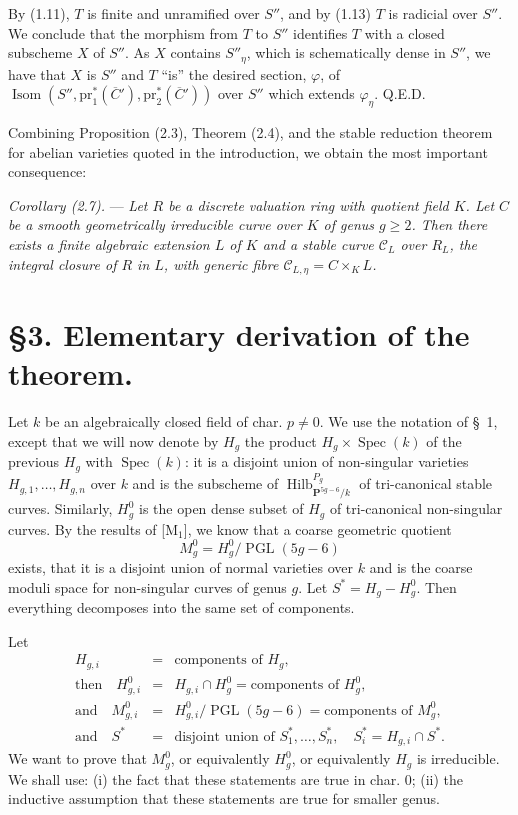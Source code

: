 \documentclass[10pt]{article}
\newcommand{\Spec}{\operatorname{Spec}}
\newcommand{\Isom}{\operatorname{Isom}}
\newcommand{\PGL}{\operatorname{PGL}}
\newcommand{\Hilb}{\operatorname{Hilb}}
\newcommand{\PP}{\mathbf P}
\begin{document}
By (1.11), $T$ is finite and unramified over $S''$, and by (1.13) $T$ is radicial over $S''$. We conclude that the morphism from $T$ to $S''$ identifies $T$ with a closed subscheme $X$ of $S''$. As $X$ contains $S''_\eta$, which is schematically dense in $S''$, we have that $X$ is $S''$ and $T$ ``is'' the desired section, $\varphi$, of $\Isom(S'',\mathrm{pr}_1^*(\overline C'),\mathrm{pr}_2^*(\overline C'))$ over $S''$ which extends $\varphi_\eta$. Q.E.D.

Combining Proposition (2.3), Theorem (2.4), and the stable reduction theorem for abelian varieties quoted in the introduction, we obtain the most important consequence:

\medskip
\noindent\emph{Corollary (2.7).} --- \emph{Let $R$ be a discrete valuation ring with quotient field $K$. Let $C$ be a smooth geometrically irreducible curve over $K$ of genus $g\geq2$. Then there exists a finite algebraic extension $L$ of $K$ and a stable curve $\mathscr C_L$ over $R_L$, the integral closure of $R$ in $L$, with generic fibre $\mathscr C_{L,\eta}=C\times_K L$.}

\section*{\S 3. Elementary derivation of the theorem.}

Let $k$ be an algebraically closed field of char. $p\ne0$. We use the notation of \S~1, except that we will now denote by $H_g$ the product $H_g\times\Spec(k)$ of the previous $H_g$ with $\Spec(k)$: it is a disjoint union of non-singular varieties $H_{g,1},\ldots,H_{g,n}$ over $k$ and is the subscheme of $\Hilb_{\PP^{5g-6}/k}^{P_g}$ of tri-canonical stable curves. Similarly, $H_g^0$ is the open dense subset of $H_g$ of tri-canonical non-singular curves. By the results of [M$_1$], we know that a coarse geometric quotient
\[
M_g^0=H_g^0/\PGL(5g-6)
\]
exists, that it is a disjoint union of normal varieties over $k$ and is the coarse moduli space for non-singular curves of genus $g$. Let $S^*=H_g-H_g^0$. Then everything decomposes into the same set of components.

Let
\[
\begin{array}{rcl}
H_{g,i}&=&\text{components of }H_g,\\
\text{then}\quad H^0_{g,i}&=&H_{g,i}\cap H_g^0=\text{components of }H_g^0,\\
\text{and}\quad M^0_{g,i}&=&H^0_{g,i}/\PGL(5g-6)=\text{components of }M_g^0,\\
\text{and}\quad S^*&=&\text{disjoint union of }S_1^*,\ldots,S_n^*,\quad S_i^*=H_{g,i}\cap S^*.
\end{array}
\]
We want to prove that $M_g^0$, or equivalently $H_g^0$, or equivalently $H_g$ is irreducible. We shall use: (i) the fact that these statements are true in char. 0; (ii) the inductive assumption that these statements are true for smaller genus.
\end{document}
